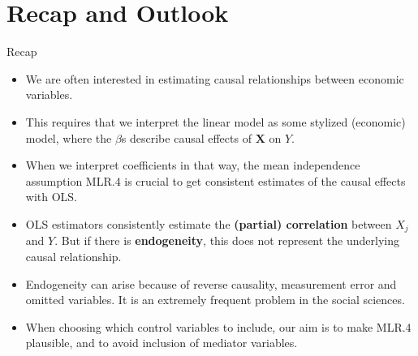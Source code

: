 \documentclass[11pt, aspectratio = 169]{beamer}
\begin{document}
\section{Recap and Outlook}

\begin{frame}{Recap}
\begin{itemize}
    \item We are often interested in estimating causal relationships between economic variables.

\item This requires that we interpret the linear model as some stylized (economic) model, where the $\beta$s describe causal effects of $\boldsymbol{X}$ on $Y$.

\item When we interpret coefficients in that way, the mean independence assumption MLR.4 is crucial to get consistent estimates of the causal effects with OLS.

\item  OLS estimators  consistently estimate the \textbf{(partial) correlation} between $X_j$ and $Y$. But if there is \textbf{endogeneity}, this  does not represent the underlying causal relationship.

\item Endogeneity can arise because of reverse causality, measurement error and omitted variables. It is an extremely frequent problem in the social sciences.

\item When choosing which control variables to include, our aim is to make MLR.4 plausible, and to avoid inclusion of mediator variables.
\end{itemize}
\end{frame}
\end{document}
